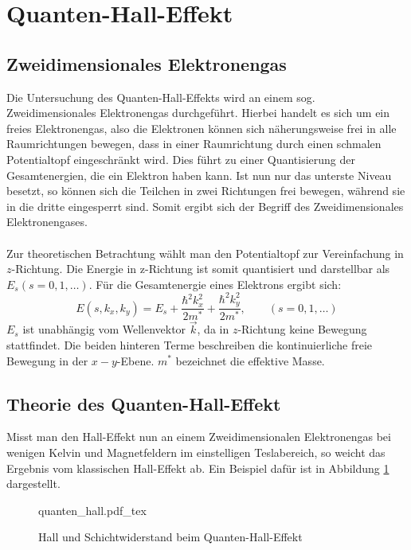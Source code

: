 \section{Quanten-Hall-Effekt}
\subsection{Zweidimensionales Elektronengas}

Die Untersuchung des Quanten-Hall-Effekts wird an einem sog. Zweidimensionales 
Elektronengas durchgeführt. Hierbei handelt es sich um ein freies Elektronengas, 
also die Elektronen können sich näherungsweise frei in alle Raumrichtungen bewegen,
dass in einer Raumrichtung durch einen schmalen Potentialtopf eingeschränkt wird.
Dies führt zu einer Quantisierung der Gesamtenergien, die ein Elektron haben kann.
Ist nun nur das unterste Niveau besetzt, so können sich die Teilchen in zwei 
Richtungen frei bewegen, während sie in die dritte eingesperrt sind. Somit ergibt
sich der Begriff des Zweidimensionales Elektronengases.\\\\
Zur theoretischen Betrachtung wählt man den Potentialtopf zur Vereinfachung in 
$z$-Richtung. Die Energie in z-Richtung ist somit quantisiert und darstellbar als
$E_{s} (s=0,1,\dots)$. Für die Gesamtenergie eines Elektrons ergibt sich:
\[
	E(s,k_{x},k_{y}) = E_{s} + \frac{\hbar^{2} k_{x}^{2}}{2m^{*}}
					   + \frac{\hbar^{2} k_{y}^{2}}{2m^{*}}, \qquad{}
	(s=0,1,\dots)
\]
$E_{s}$ ist unabhängig vom Wellenvektor $\vec{k}$, da in $z$-Richtung keine 
Bewegung stattfindet. Die beiden hinteren Terme beschreiben die kontinuierliche
freie Bewegung in der $x-y$-Ebene. $m^{*}$ bezeichnet die effektive Masse.

\subsection{Theorie des Quanten-Hall-Effekt}

Misst man den Hall-Effekt nun an einem Zweidimensionalen Elektronengas bei wenigen
Kelvin und Magnetfeldern im einstelligen Teslabereich, so weicht das Ergebnis vom
klassischen Hall-Effekt ab. Ein Beispiel dafür ist in Abbildung \ref{Abb:qhe} 
dargestellt.

\begin{figure}[ht]
    \centering
    \def\svgwidth{0.6\linewidth}
    {quanten_hall.pdf_tex}
    \caption{Hall und Schichtwiderstand beim Quanten-Hall-Effekt}
    \label{Abb:qhe}
\end{figure}


